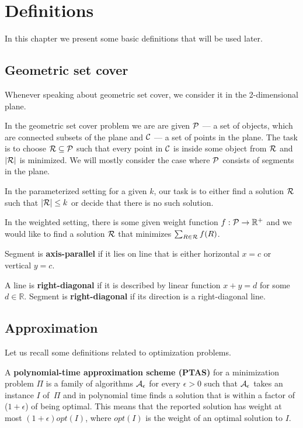 \chapter{Definitions}

In this chapter we present some basic definitions that
will be used later.

\section{Geometric set cover}
\label{section:def:geometric__set_cover}
Whenever speaking about geometric set cover,
we consider it in the 2-dimensional plane.

In the geometric set cover problem we are are given
$\mathcal{P}$ --- a set of objects, which are connected
subsets of the plane and $\mathcal{C}$ --- a set of points in the plane.
The task is to choose $\mathcal{R} \subseteq \mathcal{P}$ such that
every point in $\mathcal{C}$ is inside some object from $\mathcal{R}$
and $|\mathcal{R}|$ is minimized. We will mostly consider the case where
$\mathcal{P}$ consists of segments in the plane. 

In the parameterized setting for a given $k$,
our task is to either find a solution $\mathcal{R}$ such that $|\mathcal{R}| \le k$
or decide that there is no such solution.

In the weighted setting, there is some given weight function
$f : \mathcal{P} \rightarrow \mathbb{R^+}$
and we would like to find a solution $\mathcal{R}$
that minimizes $\sum_{R \in \mathcal{R}} f(R)$.

\begin{defi}
Segment is \textbf{axis-parallel} if it lies on line that is
either horizontal $x = c$ or vertical $y = c$.
\end{defi}

\begin{defi}
	A line is \textbf{right-diagonal} if it is
	described by linear function $x + y = d$ for some $d \in \mathbb{R}$.
	Segment is \textbf{right-diagonal} if its
	direction is a right-diagonal line.
\end{defi}

\section{Approximation}

Let us recall some definitions related to optimization problems.

\begin{defi}
A \textbf{polynomial-time approximation scheme (PTAS)}
for a minimization problem $\Pi$
is a family of algorithms $\cal{A}_\epsilon$ for
every $\epsilon > 0$
such that $\cal{A}_\epsilon$ takes an instance $I$ of~$\Pi$
and in polynomial time
finds a solution that is within a factor
of ($1+\epsilon$) of being optimal.
This means that the reported solution has weight at most
$(1+\epsilon)opt(I)$, where $opt(I)$ is the weight
of an optimal solution to $I$.
\end{defi}

